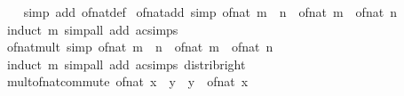 \begin{isabellebody}
%
\isadelimproof
\ \ %
\endisadelimproof
%
\isatagproof
{}\isamarkupfalse%
\ {\isacharparenleft}{\kern0pt}simp\ add{\isacharcolon}{\kern0pt}\ of{\isacharunderscore}{\kern0pt}nat{\isacharunderscore}{\kern0pt}def{\isacharparenright}{\kern0pt}%
\endisatagproof
{\isafoldproof}%
%
\isadelimproof
\isanewline
%
\endisadelimproof
\isanewline
{}\isamarkupfalse%
\ of{\isacharunderscore}{\kern0pt}nat{\isacharunderscore}{\kern0pt}add\ {\isacharbrackleft}{\kern0pt}simp{\isacharbrackright}{\kern0pt}{\isacharcolon}{\kern0pt}\ {\isachardoublequoteopen}of{\isacharunderscore}{\kern0pt}nat\ {\isacharparenleft}{\kern0pt}m\ {\isacharplus}{\kern0pt}\ n{\isacharparenright}{\kern0pt}\ {\isacharequal}{\kern0pt}\ of{\isacharunderscore}{\kern0pt}nat\ m\ {\isacharplus}{\kern0pt}\ of{\isacharunderscore}{\kern0pt}nat\ n{\isachardoublequoteclose}\isanewline
%
\isadelimproof
\ \ %
\endisadelimproof
%
\isatagproof
{}\isamarkupfalse%
\ {\isacharparenleft}{\kern0pt}induct\ m{\isacharparenright}{\kern0pt}\ {\isacharparenleft}{\kern0pt}simp{\isacharunderscore}{\kern0pt}all\ add{\isacharcolon}{\kern0pt}\ ac{\isacharunderscore}{\kern0pt}simps{\isacharparenright}{\kern0pt}%
\endisatagproof
{\isafoldproof}%
%
\isadelimproof
\isanewline
%
\endisadelimproof
\isanewline
{}\isamarkupfalse%
\ of{\isacharunderscore}{\kern0pt}nat{\isacharunderscore}{\kern0pt}mult\ {\isacharbrackleft}{\kern0pt}simp{\isacharbrackright}{\kern0pt}{\isacharcolon}{\kern0pt}\ {\isachardoublequoteopen}of{\isacharunderscore}{\kern0pt}nat\ {\isacharparenleft}{\kern0pt}m\ {\isacharasterisk}{\kern0pt}\ n{\isacharparenright}{\kern0pt}\ {\isacharequal}{\kern0pt}\ of{\isacharunderscore}{\kern0pt}nat\ m\ {\isacharasterisk}{\kern0pt}\ of{\isacharunderscore}{\kern0pt}nat\ n{\isachardoublequoteclose}\isanewline
%
\isadelimproof
\ \ %
\endisadelimproof
%
\isatagproof
{}\isamarkupfalse%
\ {\isacharparenleft}{\kern0pt}induct\ m{\isacharparenright}{\kern0pt}\ {\isacharparenleft}{\kern0pt}simp{\isacharunderscore}{\kern0pt}all\ add{\isacharcolon}{\kern0pt}\ ac{\isacharunderscore}{\kern0pt}simps\ distrib{\isacharunderscore}{\kern0pt}right{\isacharparenright}{\kern0pt}%
\endisatagproof
{\isafoldproof}%
%
\isadelimproof
\isanewline
%
\endisadelimproof
\isanewline
{}\isamarkupfalse%
\ mult{\isacharunderscore}{\kern0pt}of{\isacharunderscore}{\kern0pt}nat{\isacharunderscore}{\kern0pt}commute{\isacharcolon}{\kern0pt}\ {\isachardoublequoteopen}of{\isacharunderscore}{\kern0pt}nat\ x\ {\isacharasterisk}{\kern0pt}\ y\ {\isacharequal}{\kern0pt}\ y\ {\isacharasterisk}{\kern0pt}\ of{\isacharunderscore}{\kern0pt}nat\ x{\isachardoublequoteclose}\isanewline

\end{isabellebody}
